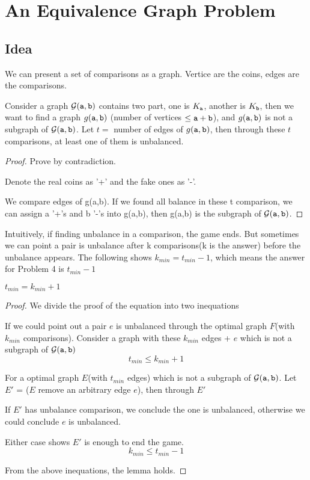 \section{An Equivalence Graph Problem}


\subsection*{Idea}
We can present a set of comparisons as a graph. Vertice are the coins, edges are the comparisons.

Consider a graph ${\cal G}(\mathtt{a},\mathtt{b})$ contains two part, one is $K_{\mathtt{a}}$, another is $K_{\mathtt{b}}$, then we want to find a graph $g(\mathtt{a},\mathtt{b})$ (number of vertices $\leq \mathtt{a}+\mathtt{b}$), and $g(\mathtt{a},\mathtt{b})$ is not a subgraph of ${\cal G}(\mathtt{a},\mathtt{b})$. 
Let $t =$ number of edges of $g(\mathtt{a},\mathtt{b})$, then through these $t$ comparisons, at least one of them is unbalanced.

\begin{proof}

Prove by contradiction.

Denote the real coins as '+' and the fake ones as '-'. 

We compare edges of g(a,b). If we found all balance in these t comparison, we can assign a '+'s and b '-'s into g(a,b), then g(a,b) is the subgraph of ${\cal G}(\mathtt{a},\mathtt{b})$.
\end{proof}

Intuitively, if finding unbalance in a comparison, the game ends. But sometimes we can point a pair is unbalance after k comparisons(k is the answer) before the unbalance appears. The following shows $k_{min}=t_{min}-1$, which means the answer for Problem 4 is $t_{min}-1$

\begin{lemma}
$t_{min} = k_{min}+1 $
\end{lemma}

\begin{proof}
We divide the proof of the equation into two inequations

If we could point out a pair $e$ is unbalanced through the optimal graph $F$(with $k_{min}$ comparisons).
Consider a graph with these $k_{min}$ edges + $e$ which is not a subgraph of ${\cal G}(\mathtt{a},\mathtt{b})$
\[t_{min}\leq k_{min}+1\]

For a optimal graph $E$(with $t_{min}$ edges) which is not a subgraph of ${\cal G}(\mathtt{a},\mathtt{b})$. Let $E'$ = ($E$ remove an arbitrary edge $e$), then through $E'$

If $E'$ has unbalance comparison, we conclude the one is unbalanced, otherwise we could conclude $e$ is unbalanced.

Either case shows $E'$ is enough to end the game.
\[k_{min} \leq t_{min}-1\]

From the above inequations, the lemma holds.

\end{proof}

